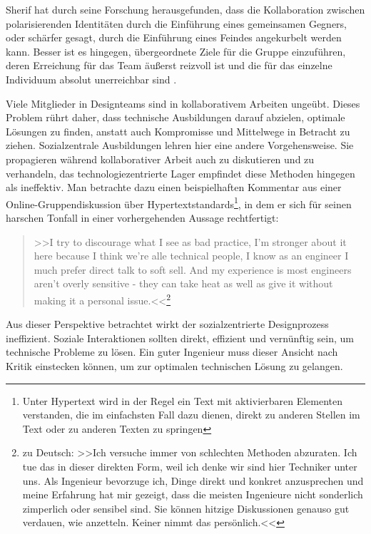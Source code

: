 Sherif hat durch seine Forschung herausgefunden, dass die Kollaboration zwischen polarisierenden Identitäten durch die Einführung eines gemeinsamen Gegners, oder schärfer gesagt, durch die Einführung eines Feindes angekurbelt werden kann. Besser ist es hingegen, übergeordnete Ziele für die Gruppe einzuführen, deren Erreichung für das Team äußerst reizvoll ist und die für das einzelne Individuum absolut unerreichbar sind \citep{Sherif:1966}.

Viele Mitglieder in Designteams sind in kollaborativem Arbeiten ungeübt. Dieses Problem rührt daher, dass technische Ausbildungen darauf abzielen, optimale Lösungen zu finden, anstatt auch Kompromisse und Mittelwege in Betracht zu ziehen. Sozialzentrale Ausbildungen lehren hier eine andere Vorgehensweise. Sie propagieren während kollaborativer Arbeit auch zu diskutieren und zu verhandeln, das technologiezentrierte Lager empfindet diese Methoden hingegen als ineffektiv. Man betrachte dazu einen beispielhaften Kommentar aus einer Online-Gruppendiskussion über Hypertextstandards\footnote{Unter Hypertext wird in der Regel ein Text mit aktivierbaren Elementen verstanden, die im einfachsten Fall dazu dienen, direkt zu anderen Stellen im Text oder zu anderen Texten zu springen}, in dem er sich für seinen harschen Tonfall in einer vorhergehenden Aussage rechtfertigt:

\begin{quote}
	>>I try to discourage what I see as bad practice, I'm stronger about it here because I think we're alle technical people, I know as an engineer I much prefer direct talk to soft sell. And my experience is most engineers aren't overly sensitive - they can take heat as well as give it without making it a personal issue.<<\footnote{zu Deutsch: >>Ich versuche immer von schlechten Methoden abzuraten. Ich tue das in dieser direkten Form, weil ich denke wir sind hier Techniker unter uns. Als Ingenieur bevorzuge ich, Dinge direkt und konkret anzusprechen und meine Erfahrung hat mir gezeigt, dass die meisten Ingenieure nicht sonderlich zimperlich oder sensibel sind. Sie können hitzige Diskussionen genauso gut verdauen, wie anzetteln. Keiner nimmt das persönlich.<<} \\\citep{Kilker:1999}
\end{quote}

Aus dieser Perspektive betrachtet wirkt der sozialzentrierte Designprozess ineffizient. Soziale Interaktionen sollten direkt, effizient und vernünftig sein, um technische Probleme zu lösen. Ein guter Ingenieur muss dieser Ansicht nach Kritik einstecken können, um zur optimalen technischen Lösung zu gelangen. 

